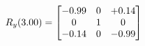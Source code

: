 \documentclass[preview]{standalone}
\begin{document}
\begin{align*}
\special{dvisvgm:raw <g id='unique000'>}R_{y}(3.00) = \begin{bmatrix}-0.99 & 0 & +0.14 \\0 & 1 & 0 \\-0.14 & 0 & -0.99\end{bmatrix}\special{dvisvgm:raw </g>}
\end{align*}
\end{document}
